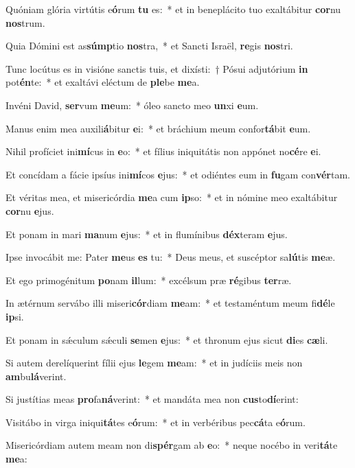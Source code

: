 \item Quóniam glória virtútis e\textbf{ó}rum \textbf{tu} es:~* et in beneplácito tuo exaltábitur \textbf{cor}nu \textbf{nos}trum.
\item Quia Dómini est as\textbf{súmp}tio \textbf{nos}tra,~* et Sancti Israël, \textbf{re}gis \textbf{nos}tri.
\item Tunc locútus es in visióne sanctis tuis, et dixísti:~† Pósui adjutórium \textbf{in} pot\textbf{én}te:~* et exaltávi eléctum de \textbf{ple}be \textbf{me}a.
\item Invéni David, \textbf{ser}vum \textbf{me}um:~* óleo sancto meo \textbf{un}xi \textbf{e}um.
\item Manus enim mea auxili\textbf{á}bitur \textbf{e}i:~* et bráchium meum confor\textbf{tá}bit \textbf{e}um.
\item Nihil profíciet ini\textbf{mí}cus in \textbf{e}o:~* et fílius iniquitátis non appónet no\textbf{cé}re \textbf{e}i.
\item Et concídam a fácie ipsíus ini\textbf{mí}cos \textbf{e}jus:~* et odiéntes eum in \textbf{fu}gam con\textbf{vér}tam.
\item Et véritas mea, et misericórdia \textbf{me}a cum \textbf{ip}so:~* et in nómine meo exaltábitur \textbf{cor}nu \textbf{e}jus.
\item Et ponam in mari \textbf{ma}num \textbf{e}jus:~* et in flumínibus \textbf{déx}teram \textbf{e}jus.
\item Ipse invocábit me: Pater \textbf{me}us \textbf{es} tu:~* Deus meus, et suscéptor sa\textbf{lú}tis \textbf{me}æ.
\item Et ego primogénitum \textbf{po}nam \textbf{il}lum:~* excélsum præ \textbf{ré}gibus \textbf{ter}ræ.
\item In ætérnum servábo illi miseri\textbf{cór}diam \textbf{me}am:~* et testaméntum meum fi\textbf{dé}le \textbf{ip}si.
\item Et ponam in sǽculum sǽculi \textbf{se}men \textbf{e}jus:~* et thronum ejus sicut \textbf{di}es \textbf{cæ}li.
\item Si autem derelíquerint fílii ejus \textbf{le}gem \textbf{me}am:~* et in judíciis meis non \textbf{am}bu\textbf{lá}verint.
\item Si justítias meas \textbf{pro}fa\textbf{ná}verint:~* et mandáta mea non \textbf{cus}to\textbf{dí}erint:
\item Visitábo in virga iniqui\textbf{tá}tes e\textbf{ó}rum:~* et in verbéribus pec\textbf{cá}ta e\textbf{ó}rum.
\item Misericórdiam autem meam non di\textbf{spér}gam ab \textbf{e}o:~* neque nocébo in veri\textbf{tá}te \textbf{me}a:
